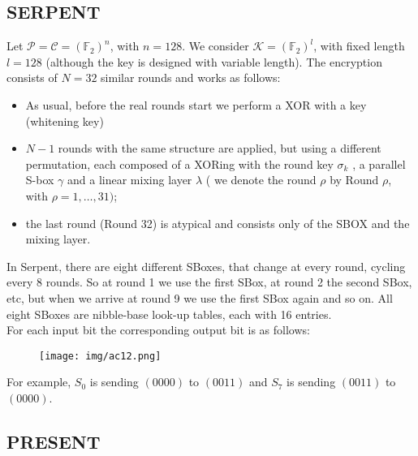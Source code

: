 \documentclass[a4paper, 10pt, titlepage]{article}
\begin{document}
\subsection{SERPENT}
Let $\mathcal{P} = \mathcal{C} = (\mathbb{F}_2)^n$, with $n = 128$. We consider $\mathcal{K} = (\mathbb{F}_2 )^l$, with fixed length $l = 128$ (although the key is designed with variable length).
The encryption consists of $N = 32$ similar rounds and works as follows:
\begin{itemize}
\item As usual, before the real rounds start we perform a XOR with a key (whitening key)
\item $N - 1$ rounds with the same structure are applied, but using a
different permutation, each composed of a XORing with the round key $\sigma_k$ , a parallel S-box $\gamma$ and a linear mixing layer $\lambda$ ( we denote the round $\rho$ by Round $\rho$, with $\rho = 1, \dots, 31)$;
\item the last round (Round 32) is atypical and consists only of the SBOX and the mixing layer.
\end{itemize}
In Serpent, there are eight different SBoxes, that change at every round, cycling every 8 rounds. So at round 1 we use the first SBox, at round 2 the second SBox, etc, but when we arrive at round 9 we use the first SBox again and so on. All eight SBoxes are nibble-base look-up tables, each with 16 entries. \\
For each input bit the corresponding output bit is as follows:
\begin{figure}[h]
\centering
\texttt{[image: img/ac12.png]}
\end{figure}
For example, $S_0$ is sending $(0000)$ to $(0011)$ and $S_7$ is sending $(0011)$ to $(0000)$.

\subsection{PRESENT}
\end{document}
